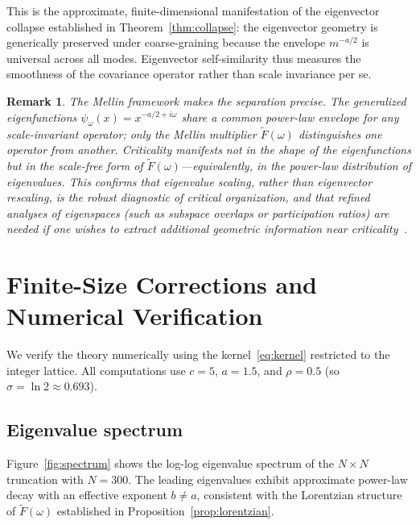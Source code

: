 \documentclass[12pt]{article}
\newtheorem{remark}[theorem]{Remark}
\begin{document}
This is the approximate, finite-dimensional manifestation of the eigenvector collapse established in Theorem~\ref{thm:collapse}: the eigenvector geometry is generically preserved under coarse-graining because the envelope $m^{-a/2}$ is universal across all modes. Eigenvector self-similarity thus measures the smoothness of the covariance operator rather than scale invariance per se.

\begin{remark}\label{rem:eigenvalue_diagnostic}
The Mellin framework makes the separation precise. The generalized eigenfunctions $\psi_\omega(x) = x^{-a/2+i\omega}$ share a common power-law envelope for \emph{any} scale-invariant operator; only the Mellin multiplier $\widetilde{F}(\omega)$ distinguishes one operator from another. Criticality manifests not in the shape of the eigenfunctions but in the scale-free form of $\widetilde{F}(\omega)$---equivalently, in the power-law distribution of eigenvalues. This confirms that eigenvalue scaling, rather than eigenvector rescaling, is the robust diagnostic of critical organization, and that refined analyses of eigenspaces (such as subspace overlaps or participation ratios) are needed if one wishes to extract additional geometric information near criticality~\cite{msi2026}.
\end{remark}


\section{Finite-Size Corrections and Numerical Verification}\label{sec:numerics}

We verify the theory numerically using the kernel~\eqref{eq:kernel} restricted to the integer lattice. All computations use $c = 5$, $a = 1.5$, and $\rho = 0.5$ (so $\sigma = \ln 2 \approx 0.693$).

\subsection{Eigenvalue spectrum}
Figure~\ref{fig:spectrum} shows the log-log eigenvalue spectrum of the $N \times N$ truncation with $N = 300$. The leading eigenvalues exhibit approximate power-law decay with an effective exponent $b \neq a$, consistent with the Lorentzian structure of $\widetilde{F}(\omega)$ established in Proposition~\ref{prop:lorentzian}.
\end{document}
